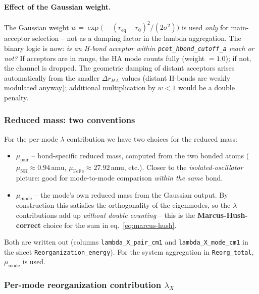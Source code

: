 \documentclass[11pt,a4paper,twoside]{article}
\theoremstyle{remark}
\begin{document}
\paragraph{Effect of the Gaussian weight.}
The Gaussian weight
$w = \exp\bigl(-(r_{\text{eq}} - r_0)^2/(2\sigma^2)\bigr)$
is used \emph{only} for main-acceptor selection -- not as a
damping factor in the lambda aggregation. The binary logic is
now: \emph{is an H-bond acceptor within
\texttt{pcet\_hbond\_cutoff\_a} reach or not?} If acceptors are in
range, the HA mode counts fully (weight $= 1.0$); if not, the
channel is dropped. The geometric damping of distant acceptors
arises automatically from the smaller $\Delta r_{HA}$ values
(distant H-bonds are weakly modulated anyway); additional
multiplication by $w < 1$ would be a double penalty.

\subsubsection*{Reduced mass: two conventions}

For the per-mode $\lambda$ contribution we have two choices for
the reduced mass:

\begin{itemize}
  \item $\mu_\text{pair}$ -- bond-specific reduced mass, computed
        from the two bonded atoms ($\mu_\text{NH} \approx 0.94$\,amu,
        $\mu_\text{FeFe} \approx 27.92$\,amu, etc.). Closer to the
        \emph{isolated-oscillator} picture: good for
        mode-to-mode comparison \emph{within the same} bond.

  \item $\mu_\text{mode}$ -- the mode's own reduced mass from the
        Gaussian output. By construction this satisfies the
        orthogonality of the eigenmodes, so the $\lambda$
        contributions add up \emph{without double counting} --
        this is the \textbf{Marcus-Hush-correct} choice for the
        sum in eq.~\ref{eq:marcus-hush}.
\end{itemize}

Both are written out (columns \texttt{lambda\_X\_pair\_cm1} and
\texttt{lambda\_X\_mode\_cm1} in the sheet
\texttt{Reorganization\_energy}). For the system aggregation in
\texttt{Reorg\_total}, $\mu_\text{mode}$ is used.

\subsubsection*{Per-mode reorganization contribution $\lambda_X$}
\end{document}
